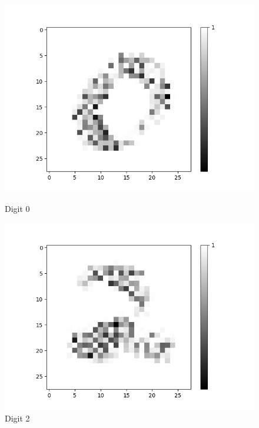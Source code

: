 \begin{figure}[H]
	\centering
	\begin{minipage}[b]{0.19\textwidth}
		\captionsetup{labelformat=empty}
		\includegraphics[width=\textwidth]{AND-OLD(LSM)/Layer0-Neuron-0.png}
		\caption{Digit 0}
	\end{minipage}
	\begin{minipage}[b]{0.19\textwidth}
		\captionsetup{labelformat=empty}
		\includegraphics[width=\textwidth]{AND-OLD(LSM)/Layer0-Neuron-2.png}
		\caption{Digit 2}
	\end{minipage}
	\begin{minipage}[b]{0.19\textwidth}
		\captionsetup{labelformat=empty}

\end{minipage}
\end{figure}
